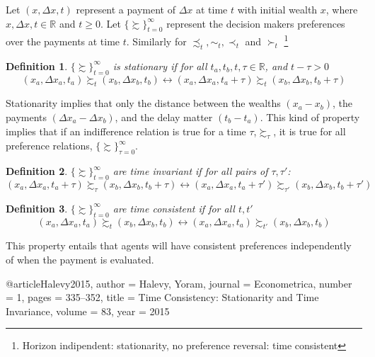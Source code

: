 \documentclass[11pt]{article}
\newtheorem{definition}{Definition}
\numberwithin{equation}{section}
\begin{document}

Let $(x ,\Delta x,t)$ represent a payment of $\Delta x $ at time $t$ with initial wealth $x$, where $x, \Delta x, t \in \mathbb{R}$ and $t \geq 0$. Let $ \{ \succsim \}^{\infty}_{t=0}$ represent the decision makers preferences over the payments at time $t$. Similarly for $\precsim_t, \sim_t, \prec_t $ and $\succ_t$ \footnote{Horizon indipendent: stationarity, no preference reversal: time consistent}



\begin{definition}
$\{ \succsim \}^{\infty}_{t=0}$ is \textit{stationary} if for all $t_a,t_b, t,\tau \in \mathbb{R}$, and $t - \tau > 0$ 
\begin{equation}
(x_a,\Delta x_a, t_a) \succsim_{t} (x_b,\Delta x_b, t_b) \leftrightarrow (x_a,\Delta x_a, t_a + \tau ) \succsim_t (x_b,\Delta x_b, t_b + \tau )
\end{equation}
\end{definition}

Stationarity implies that only the distance between the wealths $(x_a-x_b)$, the payments $(\Delta x_a-\Delta x_b)$, and the delay matter $(t_b-t_a)$. This kind of property implies that if an indifference relation is true for a time $\tau$,$ \succsim_{\tau} $, it is true for all preference relations, $\{ \succsim \}^{\infty}_{\tau=0}$. 


\begin{definition}
$\{ \succsim \}^{\infty}_{t=0}$ are time invariant if for all pairs of $\tau,\tau'$: 
\begin{equation}
(x_a,\Delta x_a, t_a+\tau) \succsim_{\tau} (x_b,\Delta x_b, t_b+ \tau) \leftrightarrow (x_a,\Delta x_a, t_a+\tau') \succsim_{\tau'} (x_b,\Delta x_b, t_b+\tau')
\end{equation}
\end{definition}

\begin{definition}
$\{ \succsim \}^{\infty}_{t=0}$ are time consistent if for all $t,t'$
\begin{equation}
(x_a,\Delta x_a, t_a) \succsim_t (x_b,\Delta x_b, t_b) \leftrightarrow (x_a,\Delta x_a, t_a) \succsim_{t'} (x_b,\Delta x_b, t_b)
\end{equation}
\end{definition}

This property entails that agents will have consistent preferences independently of when the payment is evaluated. 

@article{Halevy2015,
author = {Halevy, Yoram},
journal = {Econometrica},
number = {1},
pages = {335--352},
title = {{Time Consistency: Stationarity and Time Invariance}},
volume = {83},
year = {2015}
}
\end{document}
